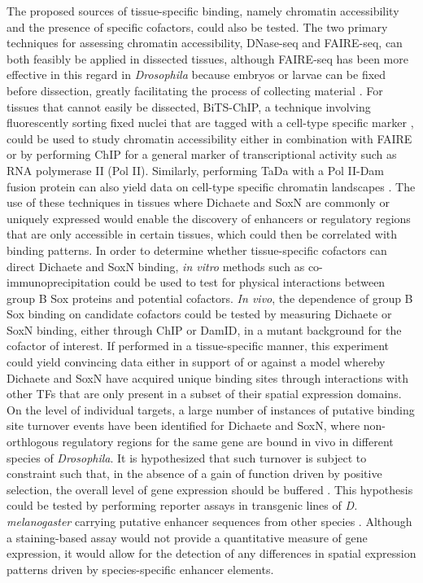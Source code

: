 The proposed sources of tissue-specific binding, namely chromatin accessibility and the presence of specific cofactors, could also be tested. The two primary techniques for assessing chromatin accessibility, DNase-seq and FAIRE-seq, can both feasibly be applied in dissected tissues, although FAIRE-seq has been more effective in this regard in \emph{Drosophila} because embryos or larvae can be fixed before dissection, greatly facilitating the process of collecting material \citep{mckay_common_2013}. For tissues that cannot easily be dissected, BiTS-ChIP, a technique involving fluorescently sorting fixed nuclei that are tagged with a cell-type specific marker \citep{bonn_tissue-specific_2012}, could be used to study chromatin accessibility either in combination with FAIRE or by performing ChIP for a general marker of transcriptional activity such as RNA polymerase II (Pol II). Similarly, performing TaDa with a Pol II-Dam fusion protein can also yield data on cell-type specific chromatin landscapes \citep{southall_cell-type-specific_2013}. The use of these techniques in tissues where Dichaete and SoxN are commonly or uniquely expressed would enable the discovery of enhancers or regulatory regions that are only accessible in certain tissues, which could then be correlated with binding patterns. In order to determine whether tissue-specific cofactors can direct Dichaete and SoxN binding, \emph{in vitro} methods such as co-immunoprecipitation could be used to test for physical interactions between group B Sox proteins and potential cofactors. \emph{In vivo}, the dependence of group B Sox binding on candidate cofactors could be tested by measuring Dichaete or SoxN binding, either through ChIP or DamID, in a mutant background for the cofactor of interest. If performed in a tissue-specific manner, this experiment could yield convincing data either in support of or against a model whereby Dichaete and SoxN have acquired unique binding sites through interactions with other TFs that are only present in a subset of their spatial expression domains.\\

On the level of individual targets, a large number of instances of putative binding site turnover events have been identified for Dichaete and SoxN, where non-orthlogous regulatory regions for the same gene are bound in vivo in different species of \emph{Drosophila}. It is hypothesized that such turnover is subject to constraint such that, in the absence of a gain of function driven by positive selection, the overall level of gene expression should be buffered \citep{he_does_2011,spivakov_analysis_2012}. This hypothesis could be tested by performing reporter assays in transgenic lines of \emph{D. melanogaster} carrying putative enhancer sequences from other species \citep{hare_sepsid_2008}. Although a staining-based assay would not provide a quantitative measure of gene expression, it would allow for the detection of any differences in spatial expression patterns driven by species-specific enhancer elements.\\

